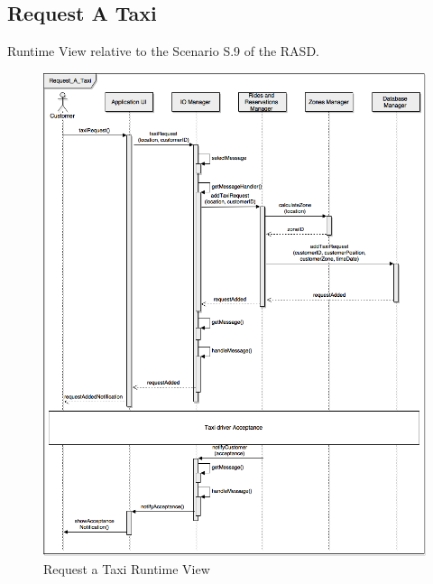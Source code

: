 \documentclass[../../../../../../dd.tex]{subfiles}
\begin{document}
	\subsection{Request A Taxi}
		Runtime View relative to the Scenario S.9 of the RASD.
		\begin{figure}[H]
				\centering
				\includegraphics[width=\textwidth, scale=0.5]{../images/SequenceDiagrams/requestATaxi.png}
			\caption{Request a Taxi Runtime View}\label{fig:RuntimeRequestATaxi}
		\end{figure}
		
\end{document}
